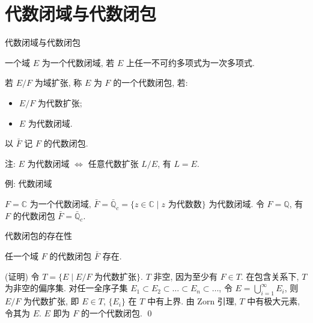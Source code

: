 
\section[闭包]{代数闭域与代数闭包}


\begin{frame}{代数闭域与代数闭包}

\begin{Def}[代数闭域]
一个域 $E$ 为一个代数闭域, 若 $E$ 上任一不可约多项式为一次多项式.
\end{Def}

\pause

若 $E/F$ 为域扩张, 称 $E$ 为 $F$ 的一个代数闭包, 若:
\begin{itemize}
\item[(i)] $E/F$ 为代数扩张;
\item[(ii)] $E$ 为代数闭域.
\end{itemize}
以 $\bar{F}$ 记 $F$ 的代数闭包.

\pause

注: $E$ 为代数闭域 $\iff$ 任意代数扩张 $L/E$, 有 $L = E$.

\end{frame}


\begin{frame}{例: 代数闭域}

\begin{eg}
$F = \mathbb{C}$ 为一个代数闭域,
$\bar{F} = \bar{\mathbb{Q}}_c = \{ z \in \mathbb{C} \mid z \text{ 为代数数} \}$
为代数闭域.
令 $F = \mathbb{Q}$, 有 $F$ 的代数闭包 $\bar{F} = \bar{\mathbb{Q}}_c$.
\end{eg}

\end{frame}


\begin{frame}{代数闭包的存在性}

\begin{prop}[代数闭包的存在性]
任一个域 $F$ 的代数闭包 $\bar{F}$ 存在.
\end{prop}

\startproof[bg=yellow, fg=red](证明)
令 $T = \{ E \mid E/F \text{ 为代数扩张} \}$.
$T$ 非空, 因为至少有 $F \in T$. 在包含关系下, $T$ 为非空的偏序集.
对任一全序子集 $E_1 \subset E_2 \subset \dots \subset E_n \subset \dots$,
令 $E = \bigcup_{i=1}^{\infty} E_i$, 则 $E/F$ 为代数扩张, 即 $E \in T$,
$\{ E_i \}$ 在 $T$ 中有上界.
由 Zorn 引理, $T$ 中有极大元素, 令其为 $E$. $E$ 即为 $F$ 的一个代数闭包.
\qed

\end{frame}

